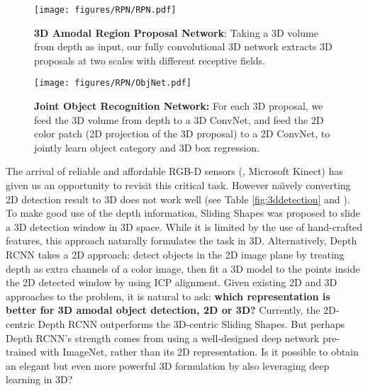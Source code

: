 \documentclass[10pt,twocolumn,letterpaper]{article}
\begin{document}
\begin{figure}[t]

\vspace{-2mm}

\texttt{[image: figures/RPN/RPN.pdf]}

\vspace{-0.5mm}
\caption{{\bf 3D Amodal Region Proposal Network}: Taking a 3D volume from depth as input,
our fully convolutional 3D network extracts 3D proposals at two scales with different receptive fields.}
\label{fig:RegionProposeNet}
\end{figure}

\begin{figure}[t]
\vspace{-3mm}
\texttt{[image: figures/RPN/ObjNet.pdf]}

\vspace{-0.5mm}
\caption{{\bf Joint Object Recognition Network:} For each 3D proposal,
we feed the 3D volume from depth to a 3D ConvNet,
and feed the 2D color patch (2D projection of the 3D proposal) to a 2D ConvNet,
to jointly learn object category and 3D box regression.
}
\label{fig:ObjectRecogNet}
\vspace{-3mm}
\end{figure}


The arrival of reliable and affordable RGB-D sensors (\eg, Microsoft Kinect)
has given us an opportunity to revisit this critical task.
However na\"{\i}vely converting 2D detection result to 3D does not work well (see Table \ref{fig:3ddetection} and \cite{guptaCVPR15}).
To make good use of the depth information, 
Sliding Shapes \cite{SlidingShapes} was proposed to slide a 3D detection window in 3D space.
While it is limited by the use of hand-crafted features, this approach naturally formulates the task in 3D. 
Alternatively, 
Depth RCNN \cite{guptaCVPR15} takes a 2D approach: detect objects in the 2D image plane by treating depth as extra channels of a color image, then fit a 3D model to the points inside the 2D detected window by using ICP alignment.
Given existing 2D and 3D approaches to the problem, 
it is natural to ask: {\bf which representation is better for 3D amodal object detection, 2D or 3D?}
Currently, the 2D-centric Depth RCNN outperforms the 3D-centric Sliding Shapes.
But perhaps Depth RCNN's strength comes from using a well-designed deep network pre-trained with ImageNet, rather than its 2D representation. 
Is it possible to obtain an elegant but even more powerful 3D formulation by also leveraging deep learning in 3D?
\end{document}
